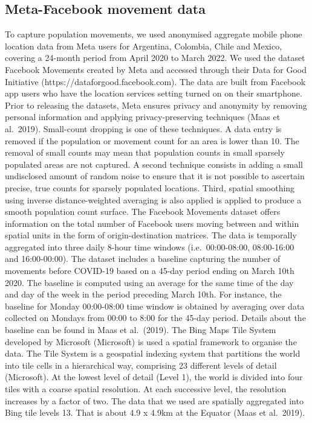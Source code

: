 \documentclass[
  11pt,
]{article}
\begin{document}
\hypertarget{meta-facebook-movement-data}{%
\subsection{Meta-Facebook movement
data}\label{meta-facebook-movement-data}}

To capture population movements, we used anonymised aggregate mobile
phone location data from Meta users for Argentina, Colombia, Chile and
Mexico, covering a 24-month period from April 2020 to March 2022. We
used the dataset Facebook Movements created by Meta and accessed through
their Data for Good Initiative (https://dataforgood.facebook.com). The
data are built from Facebook app users who have the location services
setting turned on on their smartphone. Prior to releasing the datasets,
Meta ensures privacy and anonymity by removing personal information and
applying privacy-preserving techniques (Maas et al.~2019). Small-count
dropping is one of these techniques. A data entry is removed if the
population or movement count for an area is lower than 10. The removal
of small counts may mean that population counts in small sparsely
populated areas are not captured. A second technique consists in adding
a small undisclosed amount of random noise to ensure that it is not
possible to ascertain precise, true counts for sparsely populated
locations. Third, spatial smoothing using inverse distance-weighted
averaging is also applied is applied to produce a smooth population
count surface. The Facebook Movements dataset offers information on the
total number of Facebook users moving between and within spatial units
in the form of origin-destination matrices. The data is temporally
aggregated into three daily 8-hour time windows (i.e.~00:00-08:00,
08:00-16:00 and 16:00-00:00). The dataset includes a baseline capturing
the number of movements before COVID-19 based on a 45-day period ending
on March 10th 2020. The baseline is computed using an average for the
same time of the day and day of the week in the period preceding March
10th. For instance, the baseline for Monday 00:00-08:00 time window is
obtained by averaging over data collected on Mondays from 00:00 to 8:00
for the 45-day period. Details about the baseline can be found in Maas
et al.~(2019). The Bing Maps Tile System developed by Microsoft
(Microsoft) is used a spatial framework to organise the data. The Tile
System is a geospatial indexing system that partitions the world into
tile cells in a hierarchical way, comprising 23 different levels of
detail (Microsoft). At the lowest level of detail (Level 1), the world
is divided into four tiles with a coarse spatial resolution. At each
successive level, the resolution increases by a factor of two. The data
that we used are spatially aggregated into Bing tile levels 13. That is
about 4.9 x 4.9km at the Equator (Maas et al.~2019).
\end{document}
